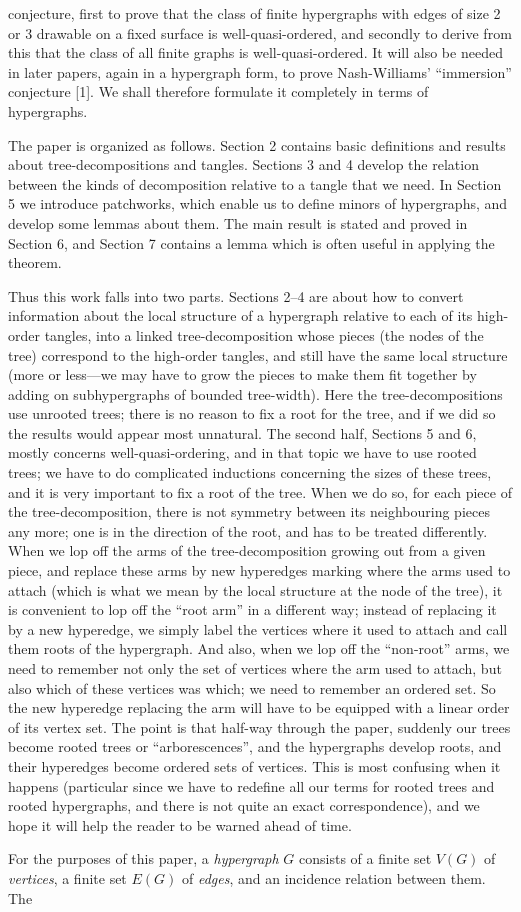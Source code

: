 \noindent conjecture, first to prove that the class of finite hypergraphs with edges of size 2 or 3 drawable on a fixed surface is well-quasi-ordered, and secondly to derive from this that the class of all finite graphs is well-quasi-ordered. It will also be needed in later papers, again in a hypergraph form, to prove Nash-Williams' ``immersion'' conjecture [1]. We shall therefore formulate it completely in terms of hypergraphs.

The paper is organized as follows. Section 2 contains basic definitions and results about tree-decompositions and tangles. Sections 3 and 4 develop the relation between the kinds of decomposition relative to a tangle that we need. In Section 5 we introduce patchworks, which enable us to define minors of hypergraphs, and develop some lemmas about them. The main result is stated and proved in Section 6, and Section 7 contains a lemma which is often useful in applying the theorem.

Thus this work falls into two parts. Sections 2--4 are about how to convert information about the local structure of a hypergraph relative to each of its high-order tangles, into a linked tree-decomposition whose pieces (the nodes of the tree) correspond to the high-order tangles, and still have the same local structure (more or less---we may have to grow the pieces to make them fit together by adding on subhypergraphs of bounded tree-width). Here the tree-decompositions use unrooted trees; there is no reason to fix a root for the tree, and if we did so the results would appear most unnatural. The second half, Sections 5 and 6, mostly concerns well-quasi-ordering, and in that topic we have to use rooted trees; we have to do complicated inductions concerning the sizes of these trees, and it is very important to fix a root of the tree. When we do so, for each piece of the tree-decomposition, there is not symmetry between its neighbouring pieces any more; one is in the direction of the root, and has to be treated differently. When we lop off the arms of the tree-decomposition growing out from a given piece, and replace these arms by new hyperedges marking where the arms used to attach (which is what we mean by the local structure at the node of the tree), it is convenient to lop off the ``root arm'' in a different way; instead of replacing it by a new hyperedge, we simply label the vertices where it used to attach and call them roots of the hypergraph. And also, when we lop off the ``non-root'' arms, we need to remember not only the set of vertices where the arm used to attach, but also which of these vertices was which; we need to remember an ordered set. So the new hyperedge replacing the arm will have to be equipped with a linear order of its vertex set. The point is that half-way through the paper, suddenly our trees become rooted trees or ``arborescences'', and the hypergraphs develop roots, and their hyperedges become ordered sets of vertices. This is most confusing when it happens (particular since we have to redefine all our terms for rooted trees and rooted hypergraphs, and there is not quite an exact correspondence), and we hope it will help the reader to be warned ahead of time.


For the purposes of this paper, a \textit{hypergraph} $G$ consists of a finite set $V(G)$ of \textit{vertices}, a finite set $E(G)$ of \textit{edges}, and an incidence relation between them. The
